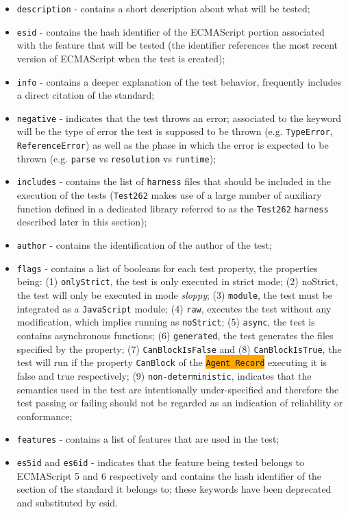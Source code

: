 \documentclass[runningheads]{llncs}
\begin{document}
\begin{itemize}
\item \texttt{description} - contains a short description about what will be tested;
%
\item \texttt{esid} - contains the hash identifier of the ECMAScript portion associated with the feature that will be tested (the identifier references the most recent version of ECMAScript when the test is created);
%
\item \texttt{info} - contains a deeper explanation of the test behavior, frequently includes a direct citation of the standard;
%
\item \texttt{negative} - indicates that the test throws an error; associated to the keyword will be the type of error the test is supposed to be thrown (e.g. \texttt{TypeError}, \texttt{ReferenceError}) as well as the phase in which the error is expected to be thrown (e.g. \texttt{parse} vs \texttt{resolution} vs \texttt{runtime});
%
\item \texttt{includes} - contains the list of \texttt{harness} files that should be included in the execution of the tests (\texttt{Test262} makes use of a large number of auxiliary function defined in a dedicated library referred to as the \texttt{Test262} \texttt{harness} described later in this section);
%
\item \texttt{author} - contains the identification of the author of the test;
%
\item \texttt{flags} - contains a list of booleans for each test property, the properties being: (1) \texttt{onlyStrict}, the test is only executed in strict mode; (2) noStrict, the test will only be executed in mode \emph{sloppy}; (3) \texttt{module}, the test must be integrated as a \texttt{JavaScript} module; (4) \texttt{raw}, executes the test without any modification, which implies running as \texttt{noStrict}; (5) \texttt{async}, the test is contains asynchronous functions; (6) \texttt{generated}, the test generates the files specified by the property; (7) \texttt{CanBlockIsFalse} and (8) \texttt{CanBlockIsTrue}, the test will run if the property \texttt{CanBlock} of the \colorbox{orange}{\texttt{Agent Record}} executing it is false and true respectively; (9) \texttt{non-deterministic}, indicates that the semantics used in the test are intentionally under-specified and therefore the test passing or failing should not be regarded as an indication of reliability or conformance;
%
%
\item \texttt{features} - contains a list of features that are used in the test;
%
\item \texttt{es5id} and \texttt{es6id} - indicates that the feature being tested belongs to ECMAScript 5 and 6 respectively and contains the hash identifier of the section of the standard it belongs to; these keywords have been deprecated and substituted by esid.
\end{itemize}
\end{document}
